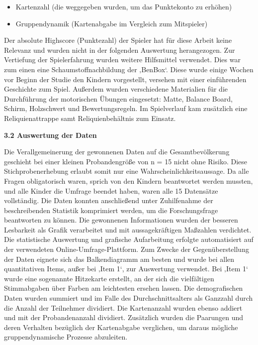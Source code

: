 \documentclass[
  a4paper,
  DIV=11,
  numbers=noendperiod,
  onecolumn,
  oneside,
  a4paper]{scrartcl}
\providecommand{\tightlist}{%
  \setlength{\itemsep}{0pt}\setlength{\parskip}{0pt}}
\begin{document}
\begin{itemize}
\tightlist
\item
  Kartenzahl (die weggegeben wurden, um das Punktekonto zu erhöhen)
\item
  Gruppendynamik (Kartenabgabe im Vergleich zum Mitspieler)
\end{itemize}

Der absolute Highscore (Punktezahl) der Spieler hat für diese Arbeit
keine Relevanz und wurden nicht in der folgenden Auswertung
herangezogen. Zur Vertiefung der Spielerfahrung wurden weitere
Hilfsmittel verwendet. Dies war zum einen eine Schaumstoffnachbildung
der ‚BenBox`. Diese wurde einige Wochen vor Beginn der Studie den
Kindern vorgestellt, versehen mit einer einführenden Geschichte zum
Spiel. Außerdem wurden verschiedene Materialien für die Durchführung der
motorischen Übungen eingesetzt: Matte, Balance Board, Schirm,
Holzschwert und Bewertungsregeln. Im Spielverlauf kam zusätzlich eine
Reliquienattrappe samt Reliquienbehältnis zum Einsatz.

\textbf{3.2 Auswertung der Daten}

Die Verallgemeinerung der gewonnenen Daten auf die Gesamtbevölkerung
geschieht bei einer kleinen Probandengröße von n = 15 nicht ohne Risiko.
Diese Stichprobenerhebung erlaubt somit nur eine
Wahrscheinlichkeitsaussage. Da alle Fragen obligatorisch waren, sprich
von den Kindern beantwortet werden mussten, und alle Kinder die Umfrage
beendet haben, waren alle 15 Datensätze vollständig. Die Daten konnten
anschließend unter Zuhilfenahme der beschreibenden Statistik komprimiert
werden, um die Forschungsfrage beantworten zu können. Die gewonnenen
Informationen wurden der besseren Lesbarkeit als Grafik verarbeitet und
mit aussagekräftigen Maßzahlen verdichtet. Die statistische Auswertung
und grafische Aufarbeitung erfolgte automatisiert auf der verwendeten
Online-Umfrage-Plattform. Zum Zwecke der Gegenüberstellung der Daten
eignete sich das Balkendiagramm am besten und wurde bei allen
quantitativen Items, außer bei ‚Item 1`, zur Auswertung verwendet. Bei
‚Item 1` wurde eine sogenannte Hitzekarte erstellt, an der sich die
vielfältigen Stimmabgaben über Farben am leichtesten ersehen lassen. Die
demografischen Daten wurden summiert und im Falle des
Durchschnittsalters als Ganzzahl durch die Anzahl der Teilnehmer
dividiert. Die Kartenanzahl wurden ebenso addiert und mit der
Probandenanzahl dividiert. Zusätzlich wurden die Paarungen und deren
Verhalten bezüglich der Kartenabgabe verglichen, um daraus mögliche
gruppendynamische Prozesse abzuleiten.
\end{document}
